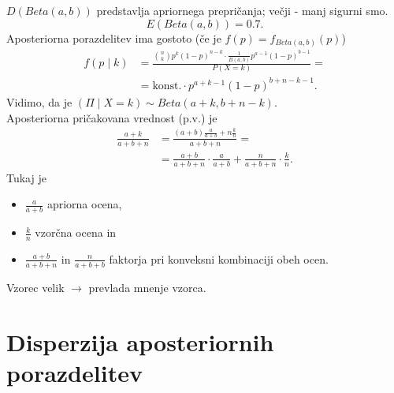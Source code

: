 \documentclass[a4paper, 12pt]{book}
\theoremstyle{definition}
\theoremstyle{remark}
\begin{document}
$D(Beta(a,b))$ predstavlja  apriornega prepričanja; večji - manj sigurni smo.
\begin{equation*}
  E(Beta(a,b)) = 0.7.
\end{equation*}
Aposteriorna porazdelitev ima gostoto (če je $f(p) = f_{Beta(a,b)}(p)$)
\begin{align*}
  f(p \mid k) &= \frac{\binom{n}{k} p^k (1-p)^{n-k} \cdot \frac{1}{B(a,b)} p^{a-1} (1-p)^{b-1}}{P(X = k)} = \\
  &= \text{konst.} \cdot p^{a+k-1} (1-p)^{b+n-k-1}.
\end{align*}
Vidimo, da je $(\Pi \mid X = k) \sim Beta(a+k, b+n-k)$. \\
Aposteriorna pričakovana vrednost (p.v.) je
\begin{align*}
  \frac{a+k}{a+b+n} &= \frac{(a+b)\frac{a}{a+b} + n \frac{k}{n}}{a+b+n} = \\
  &= \frac{a+b}{a+b+n} \cdot \frac{a}{a+b} + \frac{n}{a+b+n} \cdot \frac{k}{n}.
\end{align*}
Tukaj je
\begin{itemize}
  \item $\frac{a}{a+b}$ apriorna ocena,
  \item $\frac{k}{n}$ vzorčna ocena in
  \item $\frac{a+b}{a+b+n}$ in $\frac{n}{a+b+b}$ faktorja pri konveksni kombinaciji obeh ocen.
\end{itemize}
Vzorec velik $\to$ prevlada mnenje vzorca.



\section{Disperzija aposteriornih porazdelitev}
\end{document}
